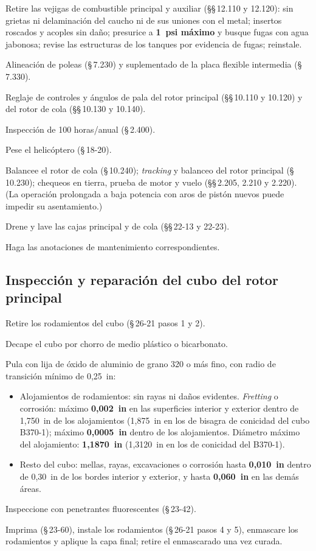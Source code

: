 \begin{pasos}
\item Retire las vejigas de combustible principal y auxiliar (\S\S\,12.110 y 12.120): sin grietas ni delaminación del caucho ni de sus uniones con el metal; insertos roscados y acoples sin daño; presurice a \textbf{1~psi máximo} y busque fugas con agua jabonosa; revise las estructuras de los tanques por evidencia de fugas; reinstale.
\item Alineación de poleas (\S\,7.230) y suplementado de la placa flexible intermedia (\S\,7.330).
\item Reglaje de controles y ángulos de pala del rotor principal (\S\S\,10.110 y 10.120) y del rotor de cola (\S\S\,10.130 y 10.140).
\item Inspección de 100 horas/anual (\S\,2.400).
\item Pese el helicóptero (\S\,18-20).
\item Balancee el rotor de cola (\S\,10.240); \emph{tracking} y balanceo del rotor principal (\S\,10.230); chequeos en tierra, prueba de motor y vuelo (\S\S\,2.205, 2.210 y 2.220). (La operación prolongada a baja potencia con aros de pistón nuevos puede impedir su asentamiento.)
\item Drene y lave las cajas principal y de cola (\S\S\,22-13 y 22-23).
\item Haga las anotaciones de mantenimiento correspondientes.
\end{pasos}

\subsection{Inspección y reparación del cubo del rotor principal}

\begin{pasos}
\item Retire los rodamientos del cubo (\S\,26-21 pasos 1 y 2).
\item Decape el cubo por chorro de medio plástico o bicarbonato.
\item Pula con lija de óxido de aluminio de grano 320 o más fino, con radio de transición mínimo de 0,25~in:
\begin{itemize}
\item Alojamientos de rodamientos: sin rayas ni daños evidentes. \emph{Fretting} o corrosión: máximo \textbf{0,002~in} en las superficies interior y exterior dentro de 1,750~in de los alojamientos (1,875~in en los de bisagra de conicidad del cubo B370-1); máximo \textbf{0,0005~in} dentro de los alojamientos. Diámetro máximo del alojamiento: \textbf{1,1870~in} (1,3120~in en los de conicidad del B370-1).
\item Resto del cubo: mellas, rayas, excavaciones o corrosión hasta \textbf{0,010~in} dentro de 0,30~in de los bordes interior y exterior, y hasta \textbf{0,060~in} en las demás áreas.
\end{itemize}
\item Inspeccione con penetrantes fluorescentes (\S\,23-42).
\item Imprima (\S\,23-60), instale los rodamientos (\S\,26-21 pasos 4 y 5), enmascare los rodamientos y aplique la capa final; retire el enmascarado una vez curada.
\end{pasos}

